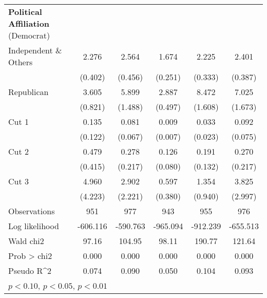 \begin{table}[htbp]
\begin{tabular}{l*{5}{c}}
\textbf{Political Affiliation} (Democrat) &  &  &  &   & \\
Independent \& Others&       2.276\sym{***}&       2.564\sym{***}&       1.674\sym{***}&       2.225\sym{***}&       2.401\sym{***}\\
                    &     (0.402)         &     (0.456)         &     (0.251)         &     (0.333)         &     (0.387)         \\
Republican          &       3.605\sym{***}&       5.899\sym{***}&       2.887\sym{***}&       8.472\sym{***}&       7.025\sym{***}\\
                    &     (0.821)         &     (1.488)         &     (0.497)         &     (1.608)         &     (1.673)         \\

Cut 1               &       0.135\sym{**} &       0.081\sym{***}&       0.009\sym{***}&       0.033\sym{***}&       0.092\sym{***}\\
                    &     (0.122)         &     (0.067)         &     (0.007)         &     (0.023)         &     (0.075)         \\
Cut 2               &       0.479         &       0.278         &       0.126\sym{***}&       0.191\sym{**} &       0.270         \\
                    &     (0.415)         &     (0.217)         &     (0.080)         &     (0.132)         &     (0.217)         \\
Cut 3               &       4.960\sym{*}  &       2.902         &       0.597         &       1.354         &       3.825\sym{*}  \\
                    &     (4.223)         &     (2.221)         &     (0.380)         &     (0.940)         &     (2.997)         \\
\hline
Observations        &         951         &         977         &         943         &         955         &         976         \\
Log likelihood      &    -606.116         &    -590.763         &    -965.094         &    -912.239         &    -655.513         \\
Wald chi2           &       97.16         &      104.95         &       98.11         &      190.77         &      121.64         \\
Prob > chi2         &       0.000         &       0.000         &       0.000         &       0.000         &       0.000         \\
Pseudo R^2          &       0.074         &       0.090         &       0.050         &       0.104         &       0.093         \\
\hline\hline
\multicolumn{7}{l}{\footnotesize \sym{*} \(p<0.10\), \sym{**} \(p<0.05\), \sym{***} \(p<0.01\)}\\


\end{tabular}
\end{table}
